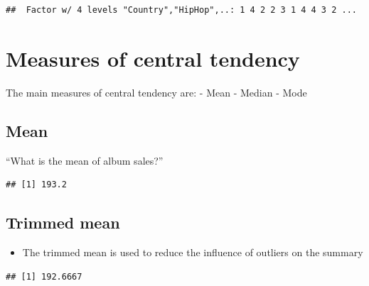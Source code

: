 \documentclass[
]{book}
\newenvironment{Shaded}{\begin{snugshade}}{\end{snugshade}}
\newcommand{\DataTypeTok}[1]{\textcolor[rgb]{0.13,0.29,0.53}{#1}}
\newcommand{\FloatTok}[1]{\textcolor[rgb]{0.00,0.00,0.81}{#1}}
\newcommand{\KeywordTok}[1]{\textcolor[rgb]{0.13,0.29,0.53}{\textbf{#1}}}
\newcommand{\NormalTok}[1]{#1}
\newcommand{\OperatorTok}[1]{\textcolor[rgb]{0.81,0.36,0.00}{\textbf{#1}}}
\providecommand{\tightlist}{%
  \setlength{\itemsep}{0pt}\setlength{\parskip}{0pt}}
\begin{document}
\begin{verbatim}
##  Factor w/ 4 levels "Country","HipHop",..: 1 4 2 2 3 1 4 4 3 2 ...
\end{verbatim}

\hypertarget{measures-of-central-tendency}{%
\section{Measures of central tendency}\label{measures-of-central-tendency}}

The main measures of central tendency are:
- Mean
- Median
- Mode

\hypertarget{mean}{%
\subsection{Mean}\label{mean}}

``What is the mean of album sales?''

\begin{Shaded}
\end{Shaded}

\begin{verbatim}
## [1] 193.2
\end{verbatim}

\hypertarget{trimmed-mean}{%
\subsection{Trimmed mean}\label{trimmed-mean}}

\begin{itemize}
\tightlist
\item
  The trimmed mean is used to reduce the influence of outliers on the summary
\end{itemize}

\begin{Shaded}
\end{Shaded}

\begin{verbatim}
## [1] 192.6667
\end{verbatim}
\end{document}
